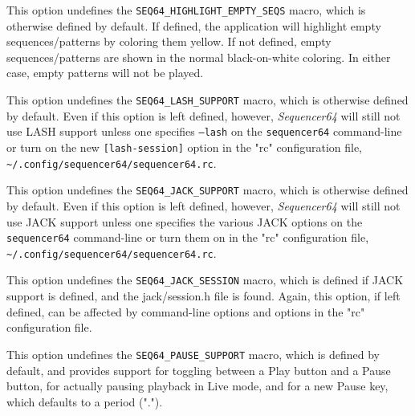         This option undefines the \texttt{SEQ64\_HIGHLIGHT\_EMPTY\_SEQS}
        macro, which is otherwise defined by default.  If defined, the
        application will
        highlight empty sequences/patterns by coloring them yellow.
        If not defined, empty sequences/patterns are shown in the normal
        black-on-white coloring.  In either case, empty patterns will not be
        played.

        This option undefines the \texttt{SEQ64\_LASH\_SUPPORT} macro, which is
        otherwise defined by default.  Even if this option is left defined,
        however, \textsl{Sequencer64} will still not use LASH support unless
        one specifies \texttt{--lash} on the \texttt{sequencer64} command-line or
        turn on the new \texttt{[lash-session]} option in the "rc"
        configuration file,
        \texttt{\textasciitilde/.config/sequencer64/sequencer64.rc}.

        This option undefines the \texttt{SEQ64\_JACK\_SUPPORT} macro, which is
        otherwise defined by default.  Even if this option is left defined,
        however, \textsl{Sequencer64} will still not use JACK support unless
        one specifies the various JACK options on the \texttt{sequencer64}
        command-line or turn them on in the "rc" configuration file,
        \texttt{\textasciitilde/.config/sequencer64/sequencer64.rc}.

        This option undefines the \texttt{SEQ64\_JACK\_SESSION} macro, which is
        defined if JACK support is defined, and the jack/session.h file is
        found.  Again, this option, if left defined, can be affected by
        command-line options and options in the "rc" configuration file.

        This option undefines the \texttt{SEQ64\_PAUSE\_SUPPORT} macro,
        which is defined by default, and provides support for toggling between
        a Play button and a Pause button, for actually pausing playback
        in Live mode, and for a new Pause key, which defaults to a
        period (".").

